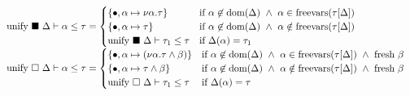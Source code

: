 \documentclass[manuscript]{acmart}
\theoremstyle{definition}
\begin{document}
\[
\begin{array}{l @{} l}

  \text{unify } \blacksquare\ \Delta \vdash \alpha \leq \tau	
  &{} =
  \begin{cases}  
    \{ \bullet,\alpha \mapsto \nu\alpha.\tau \}
    & \text{if } 
    \alpha \not\in \text{dom}(\Delta) \ \wedge\
    \alpha \in \text{freevars}(\tau[\Delta])
    \\
    \{ \bullet,\alpha \mapsto \tau \}
    & \text{if } 
    \alpha \not\in \text{dom}(\Delta) \ \wedge\
    \alpha \notin \text{freevars}(\tau[\Delta])
    \\
    \text{unify } \blacksquare\ \Delta \vdash \tau_1 \leq \tau
    &\text{if }
    \Delta(\alpha) = \tau_1
  \end{cases}
  \\
  \text{unify } \square\ \Delta \vdash \alpha \leq \tau	
  &{} =
  \begin{cases}  
    \{ \bullet,\alpha \mapsto (\nu\alpha.\tau \wedge \beta) \}
    & \text{if } 
    \alpha \not\in \text{dom}(\Delta) \ \wedge\
    \alpha \in \text{freevars}(\tau[\Delta]) \ \wedge\ 
    \text{fresh } \beta
    \\
    \{ \bullet,\alpha \mapsto \tau \wedge \beta \}
    & \text{if } 
    \alpha \not\in \text{dom}(\Delta) \ \wedge\
    \alpha \notin \text{freevars}(\tau[\Delta]) \ \wedge\ 
    \text{fresh } \beta
    \\
    \text{unify } \square\ \Delta \vdash \tau_1 \leq \tau
    &\text{if }
    \Delta(\alpha) = \tau
  \end{cases}



\end{array}
\]
\end{document}
